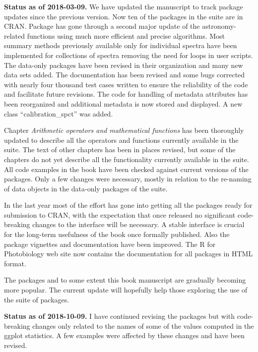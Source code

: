 \begin{shaded}
\noindent
\textbf{Status as of 2018-03-09.} We have updated the manuscript to track package updates since the previous version. Now ten of the packages in the suite are in CRAN. Package  has gone through a second major update of the astronomy-related functions using much more efficient and precise algorithms. Most summary methods previously available only for individual spectra have been implemented for collections of spectra removing the need for loops in user scripts. The data-only packages have been revised in their organization and many new data sets added. The documentation has been revised and some bugs corrected with nearly four thousand test cases written to ensure the reliability of the code and facilitate future revisions. The code for handling of metadata attributes has been reorganized and additional metadata is now stored and displayed. A new class ``calibration\_spct'' was added.

Chapter \emph{Arithmetic operators and mathematical functions} has been thoroughly updated to describe all the operators and functions currently available in the suite. The text of other chapters has been in places revised, but some of the chapters do not yet describe all the functionality currently available in the suite. All code examples in the book have been checked against current versions of the packages. Only a few changes were necessary, mostly in relation to the re-naming of data objects in the data-only packages of the suite.

In the last year most of the effort has gone into getting all the packages ready for submission to CRAN, with the expectation that once released no significant code-breaking changes to the interface will be necessary. A stable interface is crucial for the long-term usefulness of the book once formally published. Also the package vignettes and documentation have been improved. The R for Photobiology web site now contains the documentation for all packages in HTML format.

The packages and to some extent this book manuscript are gradually becoming more popular. The current update will hopefully help those exploring the use of the suite of packages.
\end{shaded}

\begin{shaded}
\noindent
\textbf{Status as of 2018-10-09.} I have continued revising the packages but with code-breaking changes only related to the names of some of the values computed in the ggplot statistics. A few examples were affected by these changes and have been revised.
\end{shaded}


